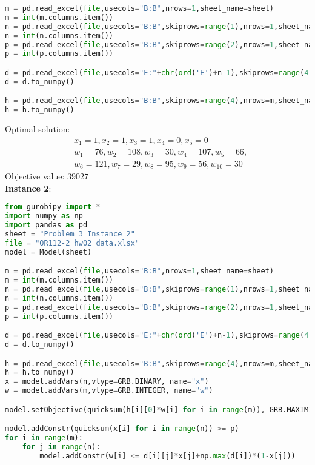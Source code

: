 \documentclass[12pt]{article}
\begin{document}
\begin{enumerate}
\begin{enumerate}
\begin{lstlisting}[language=Python]
m = pd.read_excel(file,usecols="B:B",nrows=1,sheet_name=sheet)
m = int(m.columns.item())
n = pd.read_excel(file,usecols="B:B",skiprows=range(1),nrows=1,sheet_name=sheet)
n = int(n.columns.item())
p = pd.read_excel(file,usecols="B:B",skiprows=range(2),nrows=1,sheet_name=sheet)
p = int(p.columns.item())

d = pd.read_excel(file,usecols="E:"+chr(ord('E')+n-1),skiprows=range(4),nrows=m,sheet_name=sheet)
d = d.to_numpy()

h = pd.read_excel(file,usecols="B:B",skiprows=range(4),nrows=m,sheet_name=sheet)
h = h.to_numpy()
                        \end{lstlisting}
                        Optimal solution:
                        \begin{align*}
                               & x_1 = 1,x_2 = 1,x_3 = 1,x_4 = 0,x_5 = 0              \\
                               & w_1 = 76, w_2 = 108, w_3 = 30, w_4 = 107, w_5 = 66,  \\
                               & w_6 = 121, w_7 = 29, w_8 = 95, w_9 = 56, w_{10} = 30
                        \end{align*}
                        Objective value:  $39027$\\
                        \textbf{Instance 2}:
                        \begin{lstlisting}[language=Python]
from gurobipy import *
import numpy as np
import pandas as pd
sheet = "Problem 3 Instance 2"
file = "OR112-2_hw02_data.xlsx"
model = Model(sheet)

m = pd.read_excel(file,usecols="B:B",nrows=1,sheet_name=sheet)
m = int(m.columns.item())
n = pd.read_excel(file,usecols="B:B",skiprows=range(1),nrows=1,sheet_name=sheet)
n = int(n.columns.item())
p = pd.read_excel(file,usecols="B:B",skiprows=range(2),nrows=1,sheet_name=sheet)
p = int(p.columns.item())

d = pd.read_excel(file,usecols="E:"+chr(ord('E')+n-1),skiprows=range(4),nrows=m,sheet_name=sheet)
d = d.to_numpy()

h = pd.read_excel(file,usecols="B:B",skiprows=range(4),nrows=m,sheet_name=sheet)
h = h.to_numpy()
x = model.addVars(n,vtype=GRB.BINARY, name="x")
w = model.addVars(m,vtype=GRB.INTEGER, name="w")

model.setObjective(quicksum(h[i][0]*w[i] for i in range(m)), GRB.MAXIMIZE)

model.addConstr(quicksum(x[i] for i in range(n)) >= p)
for i in range(m):
    for j in range(n):
        model.addConstr(w[i] <= d[i][j]*x[j]+np.max(d[i])*(1-x[j]))


\end{lstlisting}
\end{enumerate}
\end{enumerate}
\end{document}
